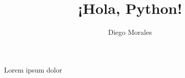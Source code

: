 \documentclass{book}
\title{¡Hola, Python!}
\author{Diego Morales}
\begin{document}
\maketitle

Lorem ipsum dolor
\end{document}

